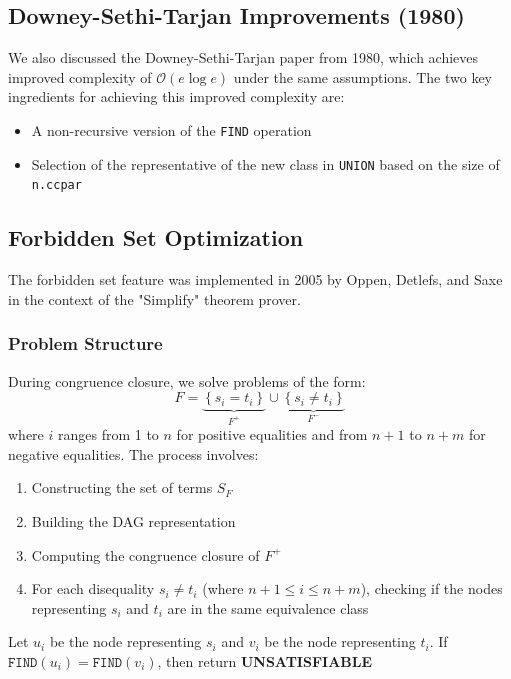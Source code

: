 \documentclass[a4paper]{article}
\theoremstyle{definition}
\begin{document}
\subsection{Downey-Sethi-Tarjan Improvements (1980)}
We also discussed the Downey-Sethi-Tarjan paper from 1980, which achieves improved complexity of \( \mathcal{O}(e \log e) \) under 
the same assumptions.
\vspace{1em}
\noindent
\newline
The two key ingredients for achieving this improved complexity are:
\begin{itemize}
	\item A non-recursive version of the \texttt{FIND} operation 
	\item Selection of the representative of the new class in \texttt{UNION} based on the size of \texttt{n.ccpar}
\end{itemize}
\subsection{Forbidden Set Optimization}
The forbidden set feature was implemented in 2005 by Oppen, Detlefs, and Saxe in the context of the "Simplify" theorem prover.
\subsubsection{Problem Structure}
During congruence closure, we solve problems of the form:
\[
  F = \underbrace{\left\{s_i = t_i\right\}}_{F^+} \cup \underbrace{\left\{s_i \neq t_i\right\}}_{F^-}
\]
where \( i \) ranges from 1 to \( n \) for positive equalities and from \( n + 1 \) to \( n + m \) for negative equalities.
\vspace{1em}
\noindent
\newline
The process involves:
\begin{enumerate}
	\item Constructing the set of terms \( S_F \)    
	\item Building the DAG representation 
	\item Computing the congruence closure of \( F^+ \)    
	\item For each disequality \( s_i \neq t_i \) (where $n + 1 \leq i \leq n + m$), checking if the nodes representing \( s_i \) and \( t_i \) are in the same equivalence class
\end{enumerate}
Let \( u_i \) be the node representing \( s_i \) and \( v_i \) be the node representing \( t_i \). If 
\( \texttt{FIND}(u_i) = \texttt{FIND}(v_i) \), then return \textbf{UNSATISFIABLE} 
\end{document}
